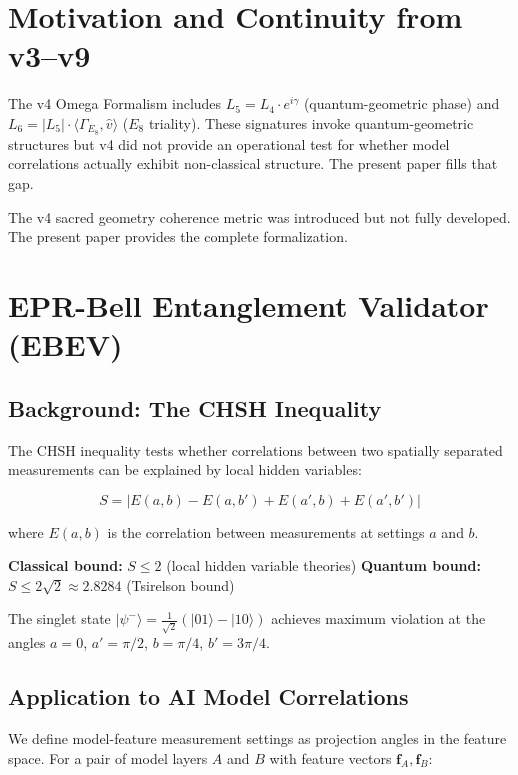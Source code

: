 \documentclass[11pt]{article}
\theoremstyle{plain}
\begin{document}
\section{Motivation and Continuity from v3–v9}

The v4 Omega Formalism includes \( L_5 = L_4 \cdot e^{i\gamma} \) (quantum-geometric phase) and \( L_6 = |L_5| \cdot \langle \Gamma_{E_8}, \hat{v} \rangle \) (\( E_8 \) triality). These signatures invoke quantum-geometric structures but v4 did not provide an operational test for whether model correlations actually exhibit non-classical structure. The present paper fills that gap.

The v4 sacred geometry coherence metric was introduced but not fully developed. The present paper provides the complete formalization.


\section{EPR-Bell Entanglement Validator (EBEV)}

\subsection{Background: The CHSH Inequality}

The CHSH inequality tests whether correlations between two spatially separated measurements can be explained by local hidden variables:

\begin{equation}
S = |E(a,b) - E(a,b') + E(a',b) + E(a',b')|
\end{equation}

where \( E(a,b) \) is the correlation between measurements at settings \( a \) and \( b \).

\textbf{Classical bound:} \( S \leq 2 \) (local hidden variable theories)
\textbf{Quantum bound:} \( S \leq 2\sqrt{2} \approx 2.8284 \) (Tsirelson bound)

The singlet state \( |\psi^-\rangle = \frac{1}{\sqrt{2}}(|01\rangle - |10\rangle) \) achieves maximum violation at the angles \( a = 0 \), \( a' = \pi/2 \), \( b = \pi/4 \), \( b' = 3\pi/4 \).

\subsection{Application to AI Model Correlations}

We define model-feature measurement settings as projection angles in the feature space. For a pair of model layers \( A \) and \( B \) with feature vectors \( \mathbf{f}_A, \mathbf{f}_B \):
\end{document}
